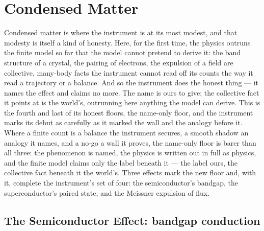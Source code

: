 \chapter{Condensed Matter}
\label{chap:condensed-matter}

Condensed matter is where the instrument is at its most modest, and that modesty is itself a kind of honesty.
Here, for the first time, the physics outruns the finite model so far that the model cannot pretend to derive
it: the band structure of a crystal, the pairing of electrons, the expulsion of a field are collective,
many-body facts the instrument cannot read off its counts the way it read a trajectory or a balance. And so
the instrument does the honest thing --- it names the effect and claims no more. The name is ours to give; the
collective fact it points at is the world's, outrunning here anything the model can derive. This is the fourth
and last of its honest floors, the name-only floor, and the instrument marks its debut as carefully as it
marked the wall and the analogy before it. Where a finite count is a balance the instrument secures, a smooth
shadow an analogy it names, and a no-go a wall it proves, the name-only floor is barer than all three: the
phenomenon is named, the physics is written out in full as physics, and the finite model claims only the label
beneath it --- the label ours, the collective fact beneath it the world's. Three effects mark the new floor
and, with it, complete the instrument's set of four: the semiconductor's bandgap, the superconductor's paired
state, and the Meissner expulsion of flux.

\section{The Semiconductor Effect: bandgap conduction}
\label{se:semiconductor}

